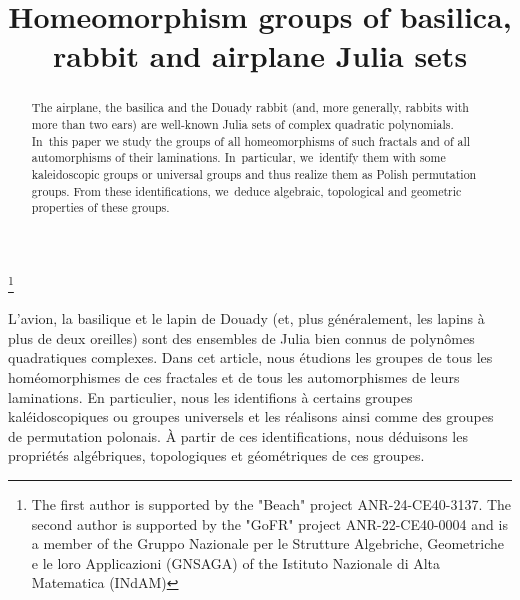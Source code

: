 \documentclass[JEP,XML,SOM,Unicode,NoFloatCountersInSection,published]{cedram}
\theoremstyle{plain}
\theoremstyle{definition}
\theoremstyle{remark}
\begin{document}
\frontmatter
\title{Homeomorphism groups of basilica, rabbit and airplane Julia sets}

\author[\initial{B.} \lastname{Duchesne}]{ }
\address{Université Paris-Saclay, CNRS, Laboratoire de mathématiques d’Orsay,\\
 91405, Orsay, France}

\author[\initial{M.} \lastname{Tarocchi}]{ }
\address{Université Paris-Saclay, CNRS, Laboratoire de mathématiques d’Orsay,\\
 91405, Orsay, France}

\thanks{The first author is supported by the "Beach" project ANR-24-CE40-3137. The second author is supported by the "GoFR" project ANR-22-CE40-0004 and is a member of the Gruppo Nazionale per le Strutture Algebriche, Geometriche e le loro Applicazioni (GNSAGA) of the Istituto Nazionale di Alta Matematica (INdAM)}


\begin{abstract}
The airplane, the basilica and the Douady rabbit (and, more generally, rabbits with more than two ears) are well-known Julia sets of complex quadratic polynomials. In~this paper we study the groups of all homeomorphisms of such fractals and of all automorphisms of their laminations. In~particular, we~identify them with some kaleidoscopic groups or universal groups and thus realize them as Polish permutation groups. From these identifications, we~deduce algebraic, topological and geometric properties of these groups.
\end{abstract}





\begin{altabstract}
L'avion, la basilique et le lapin de Douady (et, plus généralement, les lapins à plus de deux oreilles) sont des ensembles de Julia bien connus de polynômes quadratiques complexes. Dans cet article, nous étudions les groupes de tous les homéomorphismes de ces fractales et de tous les automorphismes de leurs laminations. En particulier, nous les identifions à certains groupes kaléidoscopiques ou groupes universels et les réalisons ainsi comme des groupes de permutation polonais. À partir de ces identifications, nous déduisons les propriétés algébriques, topologiques et géométriques de ces groupes.
\end{altabstract}
\end{document}
